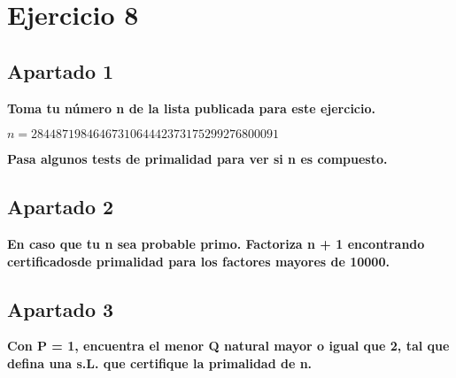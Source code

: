 \documentclass[a4paper]{article}
\title {\fbox{\Huge{\textbf{Ejercicio 8}}}}
\author {\fbox{Ana Buendía Ruiz-Azuaga}}
\begin{document}
\maketitle


\section{Ejercicio 8}

\subsection{Apartado 1}

\textbf{Toma tu número n de la lista publicada para este ejercicio.}

$n = 2844871984646731064442373175299276800091$

\textbf{Pasa algunos tests de primalidad para ver si n es compuesto.}

\subsection{Apartado 2}
\textbf{En caso que tu n sea probable primo. Factoriza n + 1 encontrando certificadosde primalidad para los factores mayores de 10000.}


\subsection{Apartado 3}

\textbf{Con P = 1, encuentra el menor Q natural mayor o igual que 2, tal que defina una s.L. que certifique la primalidad de n.}
\end{document}
